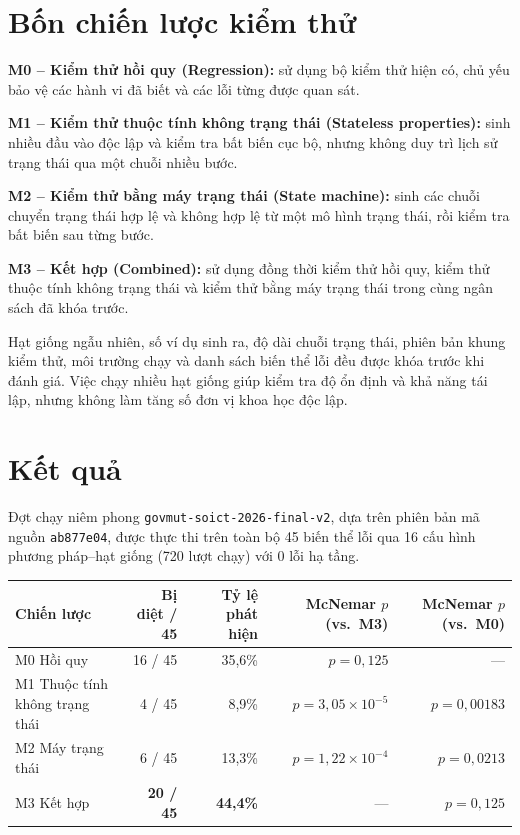 \documentclass[11pt]{article}
\begin{document}
\section{Bốn chiến lược kiểm thử}
\textbf{M0 -- Kiểm thử hồi quy (Regression):} sử dụng bộ kiểm thử hiện có, chủ yếu bảo vệ các hành vi đã biết và các lỗi từng được quan sát.

\textbf{M1 -- Kiểm thử thuộc tính không trạng thái (Stateless properties):} sinh nhiều đầu vào độc lập và kiểm tra bất biến cục bộ, nhưng không duy trì lịch sử trạng thái qua một chuỗi nhiều bước.

\textbf{M2 -- Kiểm thử bằng máy trạng thái (State machine):} sinh các chuỗi chuyển trạng thái hợp lệ và không hợp lệ từ một mô hình trạng thái, rồi kiểm tra bất biến sau từng bước.

\textbf{M3 -- Kết hợp (Combined):} sử dụng đồng thời kiểm thử hồi quy, kiểm thử thuộc tính không trạng thái và kiểm thử bằng máy trạng thái trong cùng ngân sách đã khóa trước.

Hạt giống ngẫu nhiên, số ví dụ sinh ra, độ dài chuỗi trạng thái, phiên bản khung kiểm thử, môi trường chạy và danh sách biến thể lỗi đều được khóa trước khi đánh giá. Việc chạy nhiều hạt giống giúp kiểm tra độ ổn định và khả năng tái lập, nhưng không làm tăng số đơn vị khoa học độc lập.

\section{Kết quả}
Đợt chạy niêm phong \texttt{govmut-soict-2026-final-v2}, dựa trên phiên bản mã nguồn \texttt{ab877e04}, được thực thi trên toàn bộ 45 biến thể lỗi qua 16 cấu hình phương pháp--hạt giống (720 lượt chạy) với 0 lỗi hạ tầng.

\begin{center}
\small
\begin{tabular}{lrrrr}
\toprule
Chiến lược & Bị diệt / 45 & Tỷ lệ phát hiện & McNemar $p$ (vs.\ M3) & McNemar $p$ (vs.\ M0) \\
\midrule
M0 Hồi quy & 16 / 45 & 35,6\% & $p = 0{,}125$ & --- \\
M1 Thuộc tính không trạng thái & 4 / 45 & 8,9\% & $p = 3{,}05 \times 10^{-5}$ & $p = 0{,}00183$ \\
M2 Máy trạng thái & 6 / 45 & 13,3\% & $p = 1{,}22 \times 10^{-4}$ & $p = 0{,}0213$ \\
M3 Kết hợp & \textbf{20 / 45} & \textbf{44,4\%} & --- & $p = 0{,}125$ \\
\bottomrule
\end{tabular}
\end{center}
\end{document}
